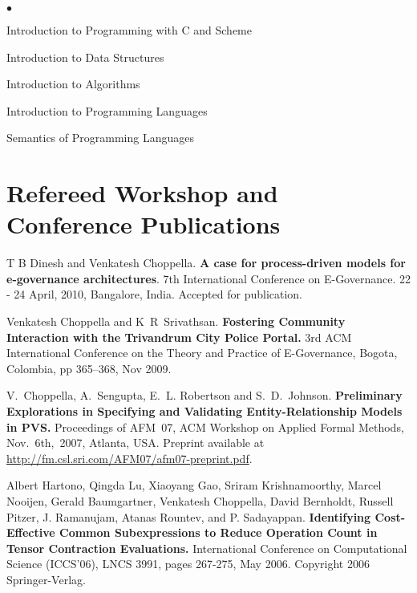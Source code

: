 \documentclass[11pt,margin,line]{res}
\newenvironment{list2}{
  \begin{list}{$\bullet$}{%
      \setlength{\itemsep}{0in}
      \setlength{\parsep}{0in} \setlength{\parskip}{0in}
      \setlength{\topsep}{0in} \setlength{\partopsep}{0in} 
      \setlength{\leftmargin}{0.2in}}}{\end{list}}
\begin{document}
\begin{resume}

\vspace*{.05in}  
\begin{list2}
\item Introduction to Programming with C and Scheme
\item Introduction to Data Structures
\item Introduction to Algorithms
\item Introduction to Programming Languages 
\item Semantics of Programming Languages
\end{list2}



\section{\sc Refereed Workshop and Conference Publications}

T B Dinesh and Venkatesh Choppella.  {\bf A case for
  process-driven models for e-governance architectures}.
7th International Conference on E-Governance.  22 - 24
April, 2010, Bangalore, India.  Accepted for publication.

Venkatesh Choppella and K~R~Srivathsan.  {\bf Fostering
  Community Interaction with the Trivandrum City Police
  Portal.}  3rd ACM International Conference on the Theory
and Practice of E-Governance, Bogota, Colombia, pp 365--368,
Nov 2009.

V.~Choppella, A.~Sengupta, E.~L. Robertson and
S.~D.~Johnson.  {\bf Preliminary Explorations in Specifying
  and Validating Entity-Relationship Models in PVS.}
Proceedings of AFM~07, ACM Workshop on Applied Formal
Methods, Nov.~6th,~2007, Atlanta, USA.  Preprint available
at \url{http://fm.csl.sri.com/AFM07/afm07-preprint.pdf}.

Albert Hartono, Qingda Lu, Xiaoyang Gao, Sriram
Krishnamoorthy, Marcel Nooijen, Gerald Baumgartner,
Venkatesh Choppella, David Bernholdt, Russell Pitzer,
J. Ramanujam, Atanas Rountev, and P. Sadayappan.  {\bf
Identifying Cost-Effective Common Subexpressions to Reduce
Operation Count in Tensor Contraction Evaluations.}
International Conference on Computational Science (ICCS'06),
LNCS 3991, pages 267-275, May 2006.  Copyright 2006
Springer-Verlag.


\end{resume}
\end{document}
